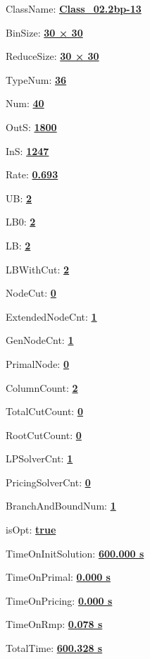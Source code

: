 \documentclass[11pt]{article}
\begin{document}
\pagestyle{empty}


ClassName: \underline{\textbf{Class_02.2bp-13}}
\par
BinSize: \underline{\textbf{30 × 30}}
\par
ReduceSize: \underline{\textbf{30 × 30}}
\par
TypeNum: \underline{\textbf{36}}
\par
Num: \underline{\textbf{40}}
\par
OutS: \underline{\textbf{1800}}
\par
InS: \underline{\textbf{1247}}
\par
Rate: \underline{\textbf{0.693}}
\par
UB: \underline{\textbf{2}}
\par
LB0: \underline{\textbf{2}}
\par
LB: \underline{\textbf{2}}
\par
LBWithCut: \underline{\textbf{2}}
\par
NodeCut: \underline{\textbf{0}}
\par
ExtendedNodeCnt: \underline{\textbf{1}}
\par
GenNodeCnt: \underline{\textbf{1}}
\par
PrimalNode: \underline{\textbf{0}}
\par
ColumnCount: \underline{\textbf{2}}
\par
TotalCutCount: \underline{\textbf{0}}
\par
RootCutCount: \underline{\textbf{0}}
\par
LPSolverCnt: \underline{\textbf{1}}
\par
PricingSolverCnt: \underline{\textbf{0}}
\par
BranchAndBoundNum: \underline{\textbf{1}}
\par
isOpt: \underline{\textbf{true}}
\par
TimeOnInitSolution: \underline{\textbf{600.000 s}}
\par
TimeOnPrimal: \underline{\textbf{0.000 s}}
\par
TimeOnPricing: \underline{\textbf{0.000 s}}
\par
TimeOnRmp: \underline{\textbf{0.078 s}}
\par
TotalTime: \underline{\textbf{600.328 s}}
\par
\newpage
\end{document}
